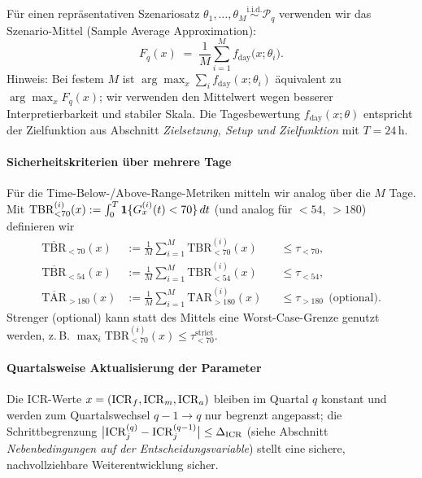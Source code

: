 \noindent Für einen repräsentativen Szenariosatz \(\theta_1,\dots,\theta_M\stackrel{\text{i.i.d.}}{\sim}\mathcal P_q\) verwenden wir das Szenario-Mittel (Sample Average Approximation):
\[
F_q(x)\;=\;\frac{1}{M}\sum_{i=1}^M f_{\text{day}}\bigl(x;\theta_i\bigr).
\]
\noindent Hinweis: Bei festem \(M\) ist \(\arg\max_x\sum_i f_{\text{day}}(x;\theta_i)\) äquivalent zu \(\arg\max_x F_q(x)\); wir verwenden den Mittelwert wegen besserer Interpretierbarkeit und stabiler Skala. Die Tagesbewertung \(f_{\text{day}}(x;\theta)\) entspricht der Zielfunktion aus Abschnitt \emph{Zielsetzung, Setup und Zielfunktion} mit \(T=24\,\mathrm{h}\).

\paragraph{Sicherheitskriterien über mehrere Tage}
Für die Time-Below-/Above-Range-Metriken mitteln wir analog über die \(M\) Tage. Mit \(\mathrm{TBR}^{(i)}_{<70}(x):=\int_0^T \mathbf{1}\{G^{(i)}_x(t)<70\}\,dt\) (und analog für \(<54\), \(>180\)) definieren wir
\begin{align}
\overline{\mathrm{TBR}}_{<70}(x)  &:= \frac{1}{M}\sum_{i=1}^M \mathrm{TBR}^{(i)}_{<70}(x)  &&\le \tau_{<70},\\
\overline{\mathrm{TBR}}_{<54}(x)  &:= \frac{1}{M}\sum_{i=1}^M \mathrm{TBR}^{(i)}_{<54}(x)  &&\le \tau_{<54},\\
\overline{\mathrm{TAR}}_{>180}(x) &:= \frac{1}{M}\sum_{i=1}^M \mathrm{TAR}^{(i)}_{>180}(x) &&\le \tau_{>180}\ \ \text{(optional)}.
\end{align}
\noindent Strenger (optional) kann statt des Mittels eine Worst-Case-Grenze genutzt werden, z.\,B. \(\max_i \mathrm{TBR}^{(i)}_{<70}(x)\le\tau_{<70}^{\text{strict}}\).

\paragraph{Quartalsweise Aktualisierung der Parameter}
Die ICR-Werte \(x=(\mathrm{ICR}_f,\mathrm{ICR}_m,\mathrm{ICR}_a)\) bleiben im Quartal \(q\) konstant und werden zum Quartalswechsel \(q-1\to q\) nur begrenzt angepasst; die Schrittbegrenzung \(\bigl|\mathrm{ICR}_j^{(q)}-\mathrm{ICR}_j^{(q-1)}\bigr|\le\Delta_{\mathrm{ICR}}\) (siehe Abschnitt \emph{Nebenbedingungen auf der Entscheidungsvariable}) stellt eine sichere, nachvollziehbare Weiterentwicklung sicher.